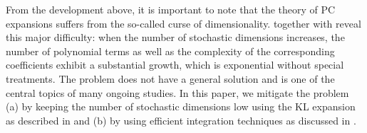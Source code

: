 From the development above, it is important to note that the theory of PC expansions suffers from the so-called curse of dimensionality.  together with  reveal this major difficulty: when the number of stochastic dimensions increases, the number of polynomial terms as well as the complexity of the corresponding coefficients exhibit a substantial growth, which is exponential without special treatments. The problem does not have a general solution and is one of the central topics of many ongoing studies. In this paper, we mitigate the problem (a) by keeping the number of stochastic dimensions low using the KL expansion as described in  and (b) by using efficient integration techniques as discussed in .
